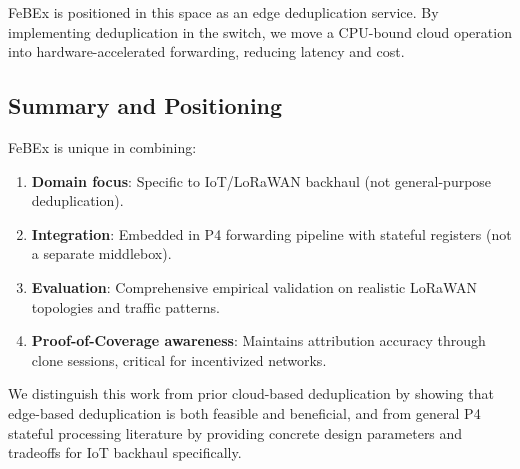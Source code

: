 FeBEx is positioned in this space as an edge deduplication service. By implementing deduplication in the switch, we move a CPU-bound cloud operation into hardware-accelerated forwarding, reducing latency and cost.

\subsection{Summary and Positioning}

FeBEx is unique in combining:
\begin{enumerate}
    \item \textbf{Domain focus}: Specific to IoT/LoRaWAN backhaul (not general-purpose deduplication).
    \item \textbf{Integration}: Embedded in P4 forwarding pipeline with stateful registers (not a separate middlebox).
    \item \textbf{Evaluation}: Comprehensive empirical validation on realistic LoRaWAN topologies and traffic patterns.
    \item \textbf{Proof-of-Coverage awareness}: Maintains attribution accuracy through clone sessions, critical for incentivized networks.
\end{enumerate}

We distinguish this work from prior cloud-based deduplication by showing that edge-based deduplication is both feasible and beneficial, and from general P4 stateful processing literature by providing concrete design parameters and tradeoffs for IoT backhaul specifically.
